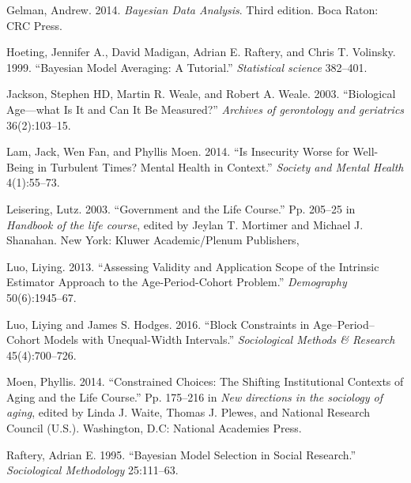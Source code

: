 \documentclass[]{article}
\begin{document}
Gelman, Andrew. 2014. \emph{Bayesian Data Analysis}. Third edition. Boca
Raton: CRC Press.

Hoeting, Jennifer A., David Madigan, Adrian E. Raftery, and Chris T.
Volinsky. 1999. ``Bayesian Model Averaging: A Tutorial.''
\emph{Statistical science} 382--401.

Jackson, Stephen HD, Martin R. Weale, and Robert A. Weale. 2003.
``Biological Age---what Is It and Can It Be Measured?'' \emph{Archives
of gerontology and geriatrics} 36(2):103--15.

Lam, Jack, Wen Fan, and Phyllis Moen. 2014. ``Is Insecurity Worse for
Well-Being in Turbulent Times? Mental Health in Context.'' \emph{Society
and Mental Health} 4(1):55--73.

Leisering, Lutz. 2003. ``Government and the Life Course.'' Pp. 205--25
in \emph{Handbook of the life course}, edited by Jeylan T. Mortimer and
Michael J. Shanahan. New York: Kluwer Academic/Plenum Publishers,

Luo, Liying. 2013. ``Assessing Validity and Application Scope of the
Intrinsic Estimator Approach to the Age-Period-Cohort Problem.''
\emph{Demography} 50(6):1945--67.

Luo, Liying and James S. Hodges. 2016. ``Block Constraints in
Age--Period--Cohort Models with Unequal-Width Intervals.''
\emph{Sociological Methods \& Research} 45(4):700--726.

Moen, Phyllis. 2014. ``Constrained Choices: The Shifting Institutional
Contexts of Aging and the Life Course.'' Pp. 175--216 in \emph{New
directions in the sociology of aging}, edited by Linda J. Waite, Thomas
J. Plewes, and National Research Council (U.S.). Washington, D.C:
National Academies Press.

Raftery, Adrian E. 1995. ``Bayesian Model Selection in Social
Research.'' \emph{Sociological Methodology} 25:111--63.
\end{document}
